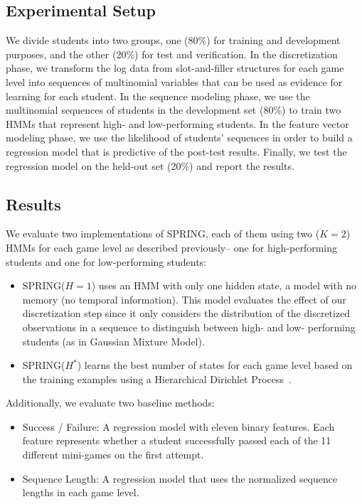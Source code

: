 \documentclass{sigchi}
\def\algname{SPRING\xspace}
\begin{document}
	\subsection{Experimental Setup}
	We divide students into two groups, one (80\%) for training and development purposes, and the other (20\%) for test and verification.
	In the discretization phase, we transform the log data from slot-and-filler structures for each game level into sequences of multinomial variables that can be used as evidence for learning for each student.
	In the sequence modeling phase, we use the multinomial sequences of students in the development set (80\%) to train two HMMs that represent high- and low-performing students.
	In the feature vector modeling phase, we use the likelihood of students' sequences in order to build a regression model that is predictive of the post-test results.
	Finally, we test the regression model on the held-out set (20\%) and report the results.
	
	\subsection{Results}
	
	
	We evaluate two implementations of SPRING, each of them using two ($K=2$) HMMs for each game level as described previously-- one for high-performing students and one for low-performing students:
	
	\begin{itemize}
		\item \algname ($H=1$) uses an HMM with only one hidden state, a model with no memory (no temporal information). This model evaluates the effect of our discretization step since it only considers the distribution of the discretized observations in a sequence to distinguish between high- and low- performing students (as in Gaussian Mixture Model).

		\item \algname ($H^*$) learns the best number of states for each game level based on the training examples using a Hierarchical Dirichlet Process~\cite{fox2008hdp}.
	\end{itemize} 
	
	Additionally, we evaluate two baseline methods:
	\begin{itemize}
		\item Success / Failure: A regression model with eleven binary features. Each feature represents whether a student  successfully passed each of the 11 different mini-games on the first attempt.
		\item Sequence Length: A regression model that uses the normalized sequence lengths in each game level. 
	\end{itemize}
	
\end{document}
